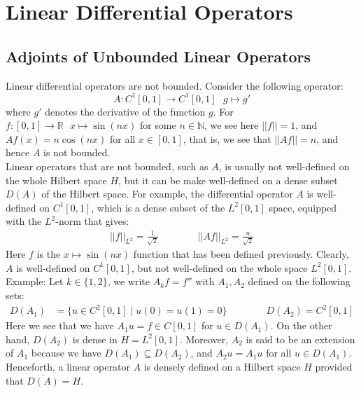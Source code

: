 \documentclass[11pt]{book}
\theoremstyle{break}
\theoremstyle{break}
\newcommand{\R}{\mathbb{R}}
\newcommand{\N}{\mathbb{N}}
\newcommand{\example}{\color{green}Example: \color{black}}
\begin{document}
\chapter{Linear Differential Operators}
\setcounter{section}{33}
\section[Adjoints of Unbounded Linear Operators]{\color{red}Adjoints of Unbounded Linear Operators\color{black}}
Linear differential operators are not bounded. Consider the following operator: 
$$A : C^1[0,1] \to C^1[0,1]\ \ \ g\mapsto g'$$ 
where $g'$ denotes the derivative of the function $g$. For $f:[0,1]\to \R  \ \ \ x\mapsto \sin(nx)$ for some $n \in \N$, we see here $||f|| = 1$, and $Af(x) = n\cos(nx)$ for all $x \in [0,1]$, that is, we see that $||Af|| = n$, and hence $A$ is not bounded.\\

Linear operators that are not bounded, such as $A$, is usually not well-defined on the whole Hilbert space $H$, but it can be make well-defined on a dense subset $D(A)$ of the Hilbert space. For example, the differential operator $A$ is well-defined on $C^1[0,1]$, which is a dense subset of the $L^2[0,1]$ space, equipped with the $L^2$-norm that gives:
\begin{align*}
||f||_{L^2} = \frac{1}{\sqrt{2}} \qquad\qquad ||Af||_{L^2} = \frac{n}{\sqrt{2}}
\end{align*}
Here $f$ is the $x\mapsto\sin(nx)$ function that has been defined previously. Clearly, $A$ is well-defined on $C^1[0,1]$, but not well-defined on the whole space $L^2[0,1]$.\\

\example Let $k \in \{1,2\}$, we write $A_kf = f''$ with $A_1,A_2$ defined on the following sets:
\begin{align*}
D(A_1) &= \{ u \in C^2[0,1] \mid u(0)=u(1) = 0\} \qquad\qquad
D(A_2) = C^2[0,1]
\end{align*}
Here we see that we have $A_1 u = f \in C[0,1]$ for $u \in D(A_1)$. On the other hand, $D(A_2)$ is dense in $H = L^2[0,1]$. Moreover, $A_2$ is said to be an extension of $A_1$ because we have $D(A_1) \subseteq D(A_2)$, and $A_2 u = A_1 u $ for all $u \in D(A_1)$. Henceforth, a linear operator $A$ is densely defined on a Hilbert space $H$ provided that $\overline{D(A)} = H$.\\
\end{document}
